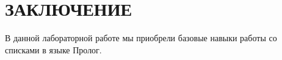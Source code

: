 \section*{ЗАКЛЮЧЕНИЕ}

В данной лабораторной работе мы приобрели базовые навыки работы 
со списками в языке Пролог.
\newpage